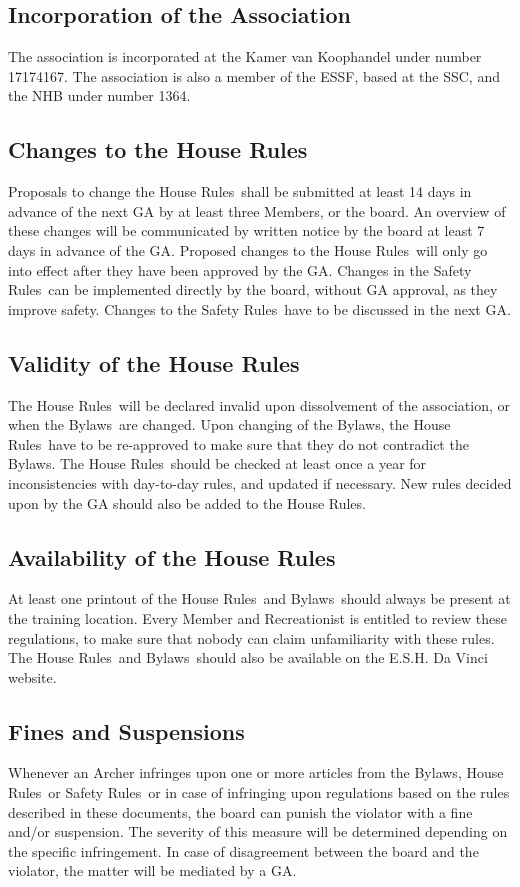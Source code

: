 \documentclass[a4paper]{article}
\newcommand{\Asta}{Bylaws} %
\newcommand{\Ahr}{House Rules} %
\newcommand{\Asr}{Safety Rules} %
\begin{document}
\subsection{Incorporation of the Association}
The association is incorporated at the Kamer van Koophandel under number 17174167. The association is also a member of the ESSF, based at the SSC, and the NHB under number 1364.

\subsection{Changes to the \Ahr}
Proposals to change the \Ahr\ shall be submitted at least 14 days in advance of the next GA by at least three Members, or the board. An overview of these changes will be communicated by written notice by the board at least 7 days in advance of the GA. Proposed changes to the \Ahr\ will only go into effect after they have been approved by the GA. Changes in the \Asr\ can be implemented directly by the board, without GA approval, as they improve safety. Changes to the \Asr\ have to be discussed in the next GA.

\subsection{Validity of the \Ahr}
The \Ahr\ will be declared invalid upon dissolvement of the association, or when the \Asta\ are changed. Upon changing of the \Asta , the \Ahr\ have to be re-approved to make sure that they do not contradict the \Asta . The \Ahr\ should be checked at least once a year for inconsistencies with day-to-day rules, and updated if necessary. New rules decided upon by the GA should also be added to the \Ahr .

\subsection{Availability of the \Ahr}
At least one printout of the \Ahr\ and \Asta\ should always be present at the training location. Every Member and Recreationist is entitled to review these regulations, to make sure that nobody can claim unfamiliarity with these rules. The \Ahr\ and \Asta\ should also be available on the E.S.H. Da Vinci website.

\subsection{Fines and Suspensions}
Whenever an Archer infringes upon one or more articles from the \Asta , \Ahr\ or \Asr\, or in case of infringing upon regulations based on the rules described in these documents, the board can punish the violator with a fine and/or suspension. The severity of this measure will be determined depending on the specific infringement. In case of disagreement between the board and the violator, the matter will be mediated by a GA.
\end{document}

